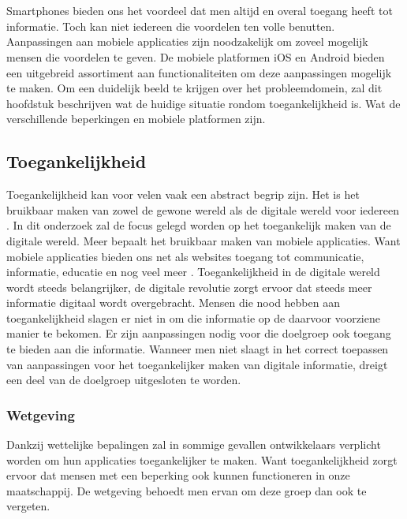 \chapter{}
\label{ch:stand-van-zaken}
Smartphones bieden ons het voordeel dat men altijd en overal toegang heeft tot informatie. Toch kan niet iedereen die voordelen ten volle benutten.  Aanpassingen aan mobiele applicaties zijn noodzakelijk om zoveel mogelijk mensen die voordelen te geven. De mobiele platformen iOS en Android bieden een uitgebreid assortiment aan functionaliteiten om deze aanpassingen mogelijk te maken. Om een duidelijk beeld te krijgen over het probleemdomein, zal dit hoofdstuk beschrijven wat de huidige situatie rondom toegankelijkheid is. Wat de verschillende beperkingen en mobiele platformen zijn.



\section{Toegankelijkheid}
\label{sec:toegankelijkheid}
Toegankelijkheid kan voor velen vaak een abstract begrip zijn. Het is het bruikbaar maken van zowel de gewone wereld als de digitale wereld voor iedereen \autocite{anySurferWat}. In dit onderzoek zal de focus gelegd worden op het toegankelijk maken van de digitale wereld. Meer bepaalt het bruikbaar maken van mobiele applicaties. Want mobiele applicaties bieden ons net als websites toegang tot communicatie, informatie, educatie en nog veel meer \autocite{introAccesibilityw3c}. Toegankelijkheid in de digitale wereld wordt steeds belangrijker, de digitale revolutie zorgt ervoor dat steeds meer informatie digitaal wordt overgebracht. Mensen die nood hebben aan toegankelijkheid slagen er niet in om die informatie op de daarvoor voorziene manier te bekomen. Er zijn aanpassingen nodig voor die doelgroep ook toegang te bieden aan die informatie.
Wanneer men niet slaagt in het correct toepassen van aanpassingen voor het toegankelijker maken van digitale informatie, dreigt een deel van de doelgroep uitgesloten te worden.





\subsection{Wetgeving}
\label{sec:wetgeving}
Dankzij wettelijke bepalingen zal in sommige gevallen ontwikkelaars verplicht worden om hun applicaties toegankelijker te maken. Want toegankelijkheid zorgt ervoor dat mensen met een beperking ook kunnen functioneren in onze maatschappij. De wetgeving behoedt men ervan om deze groep dan ook te vergeten. 

